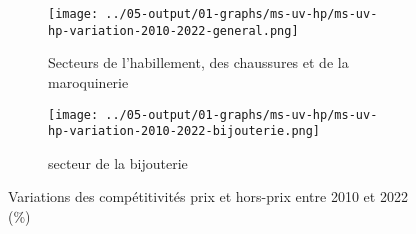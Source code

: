\documentclass[french,10pt,a4paper]{article}
\begin{document}
\begin{figure}[!h]
  \centering
  \begin{subfigure}{\textwidth}
    \centering    \texttt{[image: ../05-output/01-graphs/ms-uv-hp/ms-uv-hp-variation-2010-2022-general.png]}
    \caption{Secteurs de l'habillement, des chaussures et de la maroquinerie}
    \label{fig:ms-uv-hp-variation-2010-2022-general}
  \end{subfigure}
  \vspace{0.5cm}
  \begin{subfigure}{\textwidth}
    \centering \texttt{[image: ../05-output/01-graphs/ms-uv-hp/ms-uv-hp-variation-2010-2022-bijouterie.png]}
 \caption{secteur de la bijouterie}
 \label{fig:ms-uv-hp-variation-2010-2022-bijouterie}
  \end{subfigure}
  \caption{Variations des compétitivités prix et hors-prix entre 2010 et 2022 (\%)}
  \label{fig:ms-uv-hp-variation-2010-2022-bijouterie}
\end{figure}



\newpage


\end{document}
